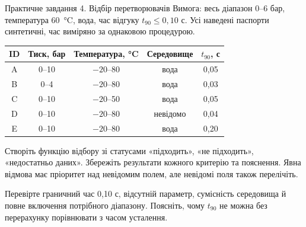 \documentclass[aspectratio=169,11pt]{beamer}
\begin{document}
\begin{frame}{Практичне завдання 4. Відбір перетворювачів}
\scriptsize
Вимога: весь діапазон 0--6 бар, температура 60~°C, вода, час відгуку $t_{90}\le0{,}10$ с. Усі наведені паспорти синтетичні, час виміряно за однаковою процедурою.
\begin{center}\begin{tabular}{ccccc}\toprule
ID & Тиск, бар & Температура, °C & Середовище & $t_{90}$, с \\\midrule
A & 0--10 & $-20$--80 & вода & 0,05 \\
B & 0--4 & $-20$--80 & вода & 0,03 \\
C & 0--10 & $-20$--50 & вода & 0,05 \\
D & 0--10 & $-20$--80 & невідомо & 0,04 \\
E & 0--10 & $-20$--80 & вода & 0,20 \\\bottomrule
\end{tabular}\end{center}
\small
Створіть функцію відбору зі статусами «підходить», «не підходить», «недостатньо даних». Збережіть результати кожного критерію та пояснення. Явна відмова має пріоритет над невідомим полем, але невідомі поля також перелічіть.

Перевірте граничний час 0,10 с, відсутній параметр, сумісність середовища й повне включення потрібного діапазону. Поясніть, чому $t_{90}$ не можна без перерахунку порівнювати з часом усталення.
\end{frame}
\end{document}
